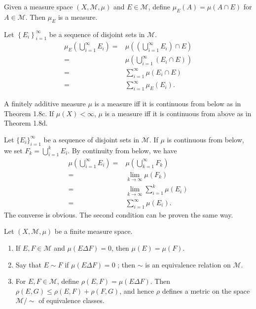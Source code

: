 \begin{exe}
  Given a measure space $\left( X,\mathcal{M},\mu \right) $ and $E\in \mathcal{M}$, define $\mu_E\left( A \right) =\mu\left( A\cap E \right) $ for $A\in \mathcal{M} $. Then $\mu_E$ is a measure.
\end{exe}
\begin{sol}
  Let $\left\{ E_i \right\} _{i=1}^{\infty}$ be a sequence of disjoint sets in $\mathcal{M}$.
  \begin{align*}
    \mu_E\left( \bigcup_{i=1} ^{\infty}E_i \right) = & \mu\left( \left(\bigcup_{i=1} ^{\infty}E_i\right)\cap E \right) \\
    = & \mu\left( \bigcup_{i=1} ^{\infty}\left( E_i\cap E \right)  \right) \\
    = & \sum_{i=1}^{\infty}\mu\left(E_i\cap E  \right)\\
    = & \sum_{i=1}^{\infty}\mu_E\left( E_i \right) 
  .\end{align*}
\end{sol}
\begin{exe}
  A finitely additive measure $\mu$ is a measure iff it is continuous from below as in Theorem 1.8c. If $\mu\left( X \right) <\infty$, $\mu$ is a measure iff it is continuous from above as in Theorem 1.8d.
\end{exe}
\begin{sol}
  Let $\{E_i\} _{i=1}^{\infty}$ be a sequence of disjoint sets in $\mathcal{M}$. If $\mu$ is continuous from below, we set $F_k=\bigcup_{i=1} ^{k}E_i$. By continuity from below, we have
\begin{align*}
  \mu\left( \bigcup_{i=1} ^{\infty}E_i \right) =&\mu\left( \bigcup_{k=1} ^{\infty}F_k \right)\\ 
  =&\lim_{k\to\infty}\mu\left( F_k \right) \\
  =& \lim_{k\to \infty}\sum_{i=1}^{k}\mu\left( E_i \right) \\
  =&\sum_{i=1}^{\infty}\mu\left( E_i \right) 
.\end{align*}
The converse is obvious. The second condition can be proven the same way.
\end{sol}
\begin{exe}
  Let $\left( X,\mathcal{M},\mu \right)$ be a finite measure space.
  \begin{enumerate}
    \item If $E,F\in \mathcal{M}$ and $\mu\left( E\Delta F \right) =0$, then $\mu\left( E \right) =\mu\left( F \right) $.
    \item Say that $E\sim F$ if $\mu\left( E\Delta F \right) =0$ ; then $\sim$ is an equivalence relation on $\mathcal{M}$.
    \item For $E,F\in \mathcal{M}$, define $\rho\left( E,F \right) =\mu\left( E\Delta F \right) $. Then $\rho\left( E,G \right) \le \rho\left( E,F \right) +\rho\left( F,G \right) $, and hence $\rho$ defines a metric on the space $\mathcal{M}\slash\sim$ of equivalence classes. 
  \end{enumerate}
\end{exe}
